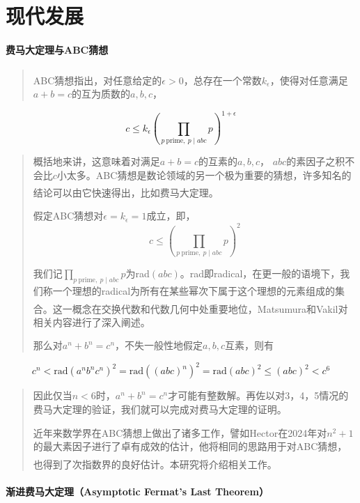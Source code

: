 \documentclass{article}
\newcommand{\upcite}[1]{\textsuperscript{\textsuperscript{\cite{#1}}}}
\begin{document}
\section{现代发展}

\paragraph{费马大定理与ABC猜想} 
\begin{quote}
ABC猜想指出\upcite{ref11}，对任意给定的$\epsilon > 0$，总存在一个常数$k_\epsilon$，使得对任意满足$a+b=c$的互为质数的$a,b,c$，
\end{quote}
$$
c \leq k_\epsilon \left(\prod_{p \ \text{prime}, \ p \mid abc} p\right)^{1+\epsilon}
$$

\begin{quote}
概括地来讲，这意味着对满足$a+b=c$的互素的$a, b, c$， $abc$的素因子之积不会比$c$小太多。ABC猜想是数论领域的另一个极为重要的猜想，许多知名的结论可以由它快速得出，比如费马大定理\upcite{ref11}。

假定ABC猜想对$\epsilon = k_\epsilon = 1$成立，即，
$$
c \leq \left(\prod_{p \ \text{prime}, \ p \mid abc} p\right)^2
$$

我们记$\prod_{p \ \text{prime}, \ p \mid abc} p$为rad$(abc)$。rad即radical，在更一般的语境下，我们称一个理想的radical为所有在某些幂次下属于这个理想的元素组成的集合。这一概念在交换代数和代数几何中处重要地位，Matsumura\upcite{ref5}和Vakil\upcite{ref7}对相关内容进行了深入阐述。

那么对$a^n + b^n = c^n$，不失一般性地假定$a, b, c$互素，则有
\end{quote}
$$
c^n < \text{rad}(a^n b^n c^n)^2 = \text{rad}((abc)^n)^2 = \text{rad}(abc)^2 \leq (abc)^2 < c^6
$$
\begin{quote}
因此仅当$n < 6$时，$a^n + b^n = c^n$才可能有整数解。再佐以对3，4，5情况的费马大定理的验证，我们就可以完成对费马大定理的证明。

近年来数学界在ABC猜想上做出了诸多工作，譬如Hector在2024年对$n^2 + 1$的最大素因子进行了卓有成效的估计，他将相同的思路用于对ABC猜想，也得到了次指数界的良好估计\upcite{ref8}。本研究将介绍相关工作。
\end{quote}

\paragraph{渐进费马大定理（Asymptotic Fermat's Last Theorem）}
\end{document}
